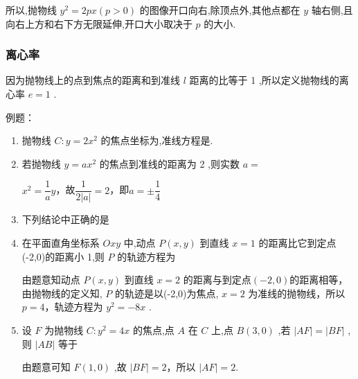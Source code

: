 所以,抛物线 ${y}^{2} = {2px}\left( {p > 0}\right)$ 的图像开口向右,除顶点外,其他点都在 $y$ 轴右侧,且向右上方和右下方无限延伸,开口大小取决于 $p$ 的大小.

\subsubsection*{离心率}
因为抛物线上的点到焦点的距离和到准线 $l$ 距离的比等于 1 ,所以定义抛物线的离心率 $e = 1$ .

例题：
\begin{enumerate}
    \item 抛物线 $C : y = 2{x}^{2}$ 的焦点坐标为,准线方程是.
    \item 若抛物线 $y = a{x}^{2}$ 的焦点到准线的距离为 2 ,则实数 $a =$
    \begin{jieda}
        ${x}^{2} = \dfrac{1}{a}y$，故$\dfrac{1}{2|a|} = 2$，即$a = \pm \dfrac{1}{4}$
    \end{jieda}
    \item 下列结论中正确的是
    \item 在平面直角坐标系 ${Oxy}$ 中,动点 $P\left( {x,y}\right)$ 到直线 $x = 1$ 的距离比它到定点(-2,0)的距离小 1,则 $P$ 的轨迹方程为 
    \begin{jieda}
        由题意知动点 $P\left( {x,y}\right)$ 到直线 $x = 2$ 的距离与到定点$(-2,0)$的距离相等，由抛物线的定义知, $P$ 的轨迹是以(-2,0)为焦点, $x = 2$ 为准线的抛物线，所以 $p = 4$，轨迹方程为 ${y}^{2} =  - {8x}$ .
    \end{jieda}
    \item 设 $F$ 为抛物线 $C : {y}^{2} = {4x}$ 的焦点,点 $A$ 在 $C$ 上,点 $B\left( {3,0}\right)$ ,若 $\left| {AF}\right|  = \left| {BF}\right|$ ,则 $\left| {AB}\right|$ 等于
    \begin{jieda}
        由题意可知 $F\left( {1,0}\right)$ ,故 $\left| {BF}\right|  = 2$，所以 $\left| {AF}\right|  = 2$.


\end{jieda}
\end{enumerate}
